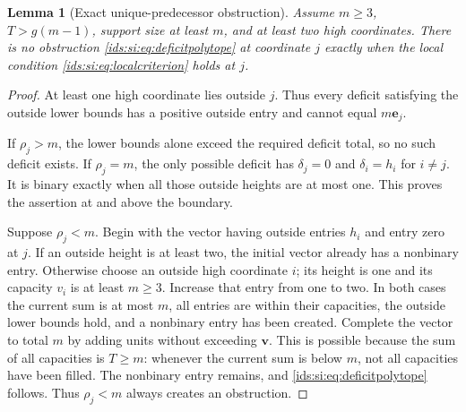 \documentclass[11pt,letterpaper]{article}
\newtheorem{lemma}[theorem]{Lemma}
\theoremstyle{definition}\newtheorem{definition}[theorem]{Definition}
\theoremstyle{remark}\newtheorem{remark}[theorem]{Remark}
\theoremstyle{definition}\newtheorem{question}[theorem]{Question}
\begin{document}
\begin{lemma}[Exact unique-predecessor obstruction]\label{ids:si:lem:local}
Assume $m\geq3$, $T>g(m-1)$, support size at least $m$, and at least two
high coordinates. There is no obstruction \eqref{ids:si:eq:deficitpolytope} at
coordinate $j$ exactly when the local condition
\eqref{ids:si:eq:localcriterion} holds at $j$.
\end{lemma}
\begin{proof}
At least one high coordinate lies outside $j$. Thus every deficit satisfying
the outside lower bounds has a positive outside entry and cannot equal
$m\mathbf e_j$.

If $\rho_j>m$, the lower bounds alone exceed the required deficit total, so no
such deficit exists. If $\rho_j=m$, the only possible deficit has
$\delta_j=0$ and $\delta_i=h_i$ for $i\ne j$. It is binary exactly when
all those outside heights are at most one. This proves the assertion at
and above the boundary.

Suppose $\rho_j<m$. Begin with the vector having outside entries $h_i$ and
entry zero at $j$. If an outside height is at least two, the initial vector
already has a nonbinary entry. Otherwise choose an outside high coordinate
$i$; its height is one and its capacity $v_i$ is at least $m\geq3$.
Increase that entry from one to two. In both cases the current sum is at
most $m$, all entries are within their capacities, the outside lower bounds
hold, and a nonbinary entry has been created. Complete the vector to total
$m$ by adding units without exceeding $\mathbf v$. This is possible because the
sum of all capacities is $T\geq m$: whenever the current sum is below $m$,
not all capacities have been filled. The nonbinary entry remains, and
\eqref{ids:si:eq:deficitpolytope} follows. Thus $\rho_j<m$ always creates an obstruction.
\end{proof}
\end{document}
